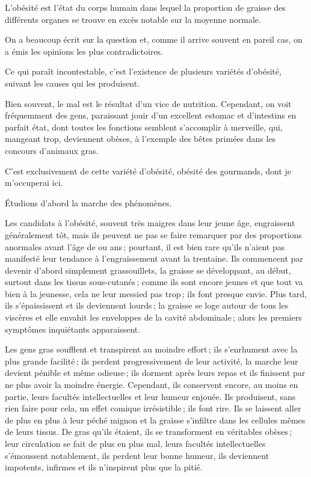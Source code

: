 \sk

\bigskip

L'obésité est l'état du corps humain dans lequel la proportion de graisse des
différents organes se trouve en excès notable sur la moyenne normale.

On a beaucoup écrit sur la question et, comme il arrive souvent en pareil cas,
on a émis les opinions les plus contradictoires.

Ce qui paraît incontestable, c'est l'existence de plusieurs variétés d'obésité,
suivant les causes qui les produisent.

Bien souvent, le mal est le résultat d’un vice de nutrition. Cependant, on voit
fréquemment des gens, paraissant jouir d'un excellent estomac et d'intestins en
parfait état, dont toutes les fonctions semblent s’accomplir à merveille, qui,
mangeant trop, deviennent obèses, à l'exemple des bêtes primées dans les
concours d'animaux gras.

C'est exclusivement de cette variété d'obésité, obésité des gourmands, dont je
m'occuperai ici.

Étudions d'abord la marche des phénomènes.

Les candidats à l'obésité, souvent très maigres dans leur jeune âge,
engraissent généralement tôt, mais ils peuvent ne pas se faire remarquer par
des proportions anormales avant l’âge de {\mmm} ou {\mmm} ans ;
pourtant, il est bien rare qu'ils n'aient pas manifesté leur tendance
à l'engraissement avant la trentaine. Ils commencent par devenir d'abord
simplement grassouillets, la graisse se développant, au début, surtout dans les
tissus sous-cutanés ; comme ils sont encore jeunes et que tout va bien à la
jeunesse, cela ne leur messied pas trop ; ils font presque envie. Plus tard,
ils s'épaississent et ils deviennent lourds ; la graisse se loge autour de tous
les viscères et elle envahit les enveloppes de la cavité abdominale ; alors les
premiers symptômes inquiétants apparaissent.

Les gens gras soufflent et transpirent au moindre effort ; ils s'enrhument avec
la plus grande facilité ; ils perdent progressivement de leur activité, la
marche leur devient pénible et même odieuse ; ils dorment après leurs repas et
ils finissent par ne plus avoir la moindre énergie. Cependant, ils conservent
encore, au moins en partie, leurs facultés intellectuelles et leur humeur
enjouée. Ils produisent, sans rien faire pour cela, un effet comique
irrésistible ; ils font rire. Ils se laissent aller de plus en plus à leur
péché mignon et la graisse s'infiltre dans les cellules mêmes de leurs tissus.
De gras qu'ils étaient, ils se transforment en véritables obèses ; leur
circulation se fait de plus en plus mal, leurs facultés intellectuelles
s'émoussent notablement, ils perdent leur bonne humeur, ils deviennent
impotents, infirmes et ils n'inspirent plus que la pitié.

